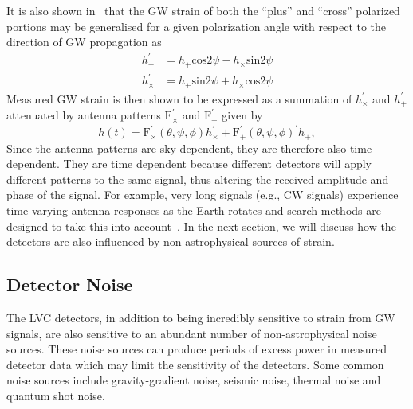 It is also shown in~\cite{Capano2011SearchingFG} that the 
\ac{GW} strain of both the ``plus'' and ``cross'' polarized portions 
may be generalised for a given polarization angle with respect to the 
direction of \ac{GW} propagation as 
%
\begin{align}
    h_{+}^{'} &= h_{+}\mathrm{cos}2\psi - h_{\times} \mathrm{sin}2\psi \\
    h_{\times}^{'} &= h_{+}\mathrm{sin}2\psi + h_{\times}\mathrm{cos}2\psi
\end{align}
%
Measured \ac{GW} strain is then shown to be expressed as a summation of $h_{\times}^{'}$ 
and $h_{+}^{'}$ attenuated by antenna patterns $\mathrm{F}_{\times}^{'}$ and $\mathrm{F}_{+}^{'}$ given by
%
\begin{equation}
    h(t) = \mathrm{F}_{\times}^{'}(\theta,\psi,\phi)h_{\times}^{'} + \mathrm{F}_{+}^{'}(\theta,\psi,\phi)^{'}h_{+}, \label{eq:measured_strain}
\end{equation}
%
Since the antenna patterns are sky dependent, they are therefore also time dependent. They are time dependent because different detectors will apply different patterns to the same signal, thus altering the received amplitude and phase of the signal. 
For example, very long signals (e.g., \ac{CW} signals) experience time varying antenna responses as the Earth rotates and search methods 
are designed to take this into account~\cite{1712.05897}. In the next 
section, we will discuss how the detectors are also influenced 
by non-astrophysical sources of strain.

\subsection{Detector Noise}\label{sec:detector_noise}

The \ac{LVC} detectors, in addition to being incredibly sensitive to 
strain from \ac{GW} signals, are also sensitive to an abundant number of 
non-astrophysical noise sources. These noise sources can produce 
periods of excess power in measured detector data which may limit 
the sensitivity of the detectors. Some common noise sources include 
gravity-gradient noise, seismic 
noise, thermal noise and quantum shot noise.

